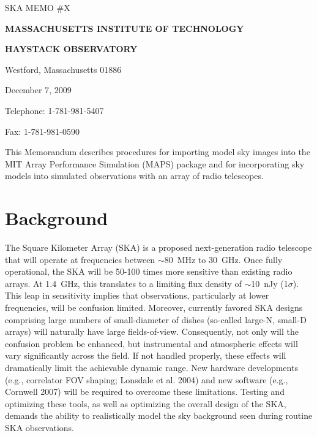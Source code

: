 \documentclass[12pt,psfig]{article}
\begin{document}
\begin{flushright}
{\large SKA MEMO \#X}
\end{flushright}
\smallskip


\bigskip

\centerline{\large\bf MASSACHUSETTS INSTITUTE OF TECHNOLOGY}
\centerline{\large\bf HAYSTACK OBSERVATORY}
\smallskip
\centerline{\normalsize Westford, Massachusetts 01886}
\bigskip
\bigskip
\centerline{December 7, 2009}
\bigskip

\begin{flushright}
Telephone: 1-781-981-5407

Fax: 1-781-981-0590
\end{flushright}
\bigskip
\bigskip

\bigskip

\bigskip


\bigskip

\noindent This Memorandum describes procedures for importing model sky
images into the MIT
Array Performance Simulation (MAPS) package and for incorporating sky
models into simulated observations with an array of radio telescopes. 


\bigskip
\bigskip

\section{Background\protect\label{background}}
%
The Square Kilometer Array (SKA) is a proposed next-generation radio 
telescope that 
will operate at frequencies between $\sim$80~MHz to 30~GHz. Once 
fully operational, the SKA will  
be 50-100 times more sensitive than existing radio arrays. At 1.4~GHz,
this translates to a limiting flux density of $\sim$10~nJy
(1$\sigma$). 
This leap in sensitivity implies that observations, particularly at lower
frequencies, will be confusion limited. 
Moreover, currently favored SKA designs comprising large numbers of
small-diameter of dishes (so-called large-N, small-D arrays) will
naturally have large fields-of-view. Consequently, not only will the
confusion problem be enhanced, but instrumental and
atmospheric effects will vary significantly across the field. If not
handled properly, these effects will dramatically limit the achievable
dynamic range. New hardware 
developments (e.g., correlator FOV shaping;
Lonsdale et al. 2004) and new software (e.g., Cornwell 2007)
will be required to overcome these limitations. Testing and
optimizing these tools, as well as optimizing the overall design of
the SKA, demands the ability to realistically model the 
sky background seen during routine SKA observations. 
\end{document}
